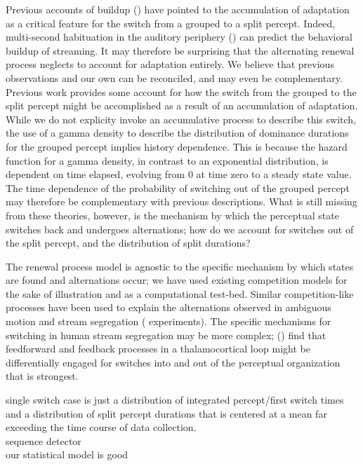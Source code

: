 \documentclass{frontiersSCNS} %
\begin{document}
Previous accounts of buildup (\cite{Micheyl2005, Pressnitzer2008}) have pointed to the accumulation of adaptation as a critical feature for the switch from a grouped to a split percept. Indeed, multi-second habituation in the auditory periphery (\cite{Pressnitzer2008}) can predict the behavioral buildup of streaming. It may therefore be surprising that the alternating renewal process neglects to account for adaptation entirely. We believe that previous observations and our own can be reconciled, and may even be complementary. Previous work provides some account for how the switch from the grouped to the split percept might be accomplished as a result of an accumulation of adaptation. While we do not explicity invoke an accumulative process to describe this switch, the use of a gamma density to describe the distribution of dominance durations for the grouped percept implies history dependence. This is because the hazard function for a gamma density, in contrast to an exponential distribution, is dependent on time elapsed, evolving from 0 at time zero to a steady state value. The time dependence of the probability of switching out of the grouped percept may therefore be complementary with previous descriptions. What is still missing from these theories, however, is the mechanism by which the perceptual state switches back and undergoes alternations; how do we account for switches out of the split percept, and the distribution of split durations? 

The renewal process model is agnostic to the specific mechanism by which states are found and alternations occur; we have used existing competition models for the sake of illustration and as a computational test-bed. Similar competition-like processes have been used to explain the alternations observed in ambiguous motion \cite{} and stream segregation (\cite{Mill2013} experiments). The specific mechanisms for switching in human stream segregation may be more complex; (\cite{Kondo2009}) find that feedforward and feedback processes in a thalamocortical loop might be differentially engaged for switches into and out of the perceptual organization that is strongest. 

single switch case is just a distribution of integrated percept/first switch times and a distribution of split percept durations that is centered at a mean far exceeding the time course of data collection.\\
sequence detector\\
our statistical model is good
\end{document}
